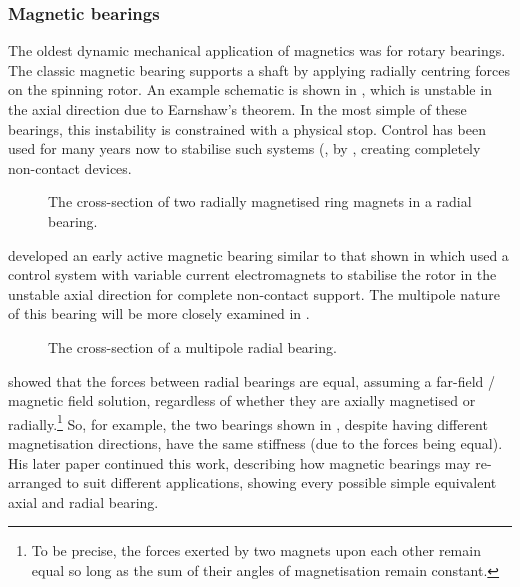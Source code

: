 \subsubsection{Magnetic bearings}

The oldest dynamic mechanical application of magnetics was for rotary
bearings.  The classic magnetic bearing supports a shaft by applying
radially centring forces on the spinning rotor. An example schematic
is shown in , which is unstable in the axial
direction due to Earnshaw's theorem. In the most simple of these
bearings, this instability is constrained with a physical stop.
Control has been used for many years now to stabilise such systems
(\eg, by \textcite{shimizu1968}, creating completely non-contact devices.

\begin{figure}
  \caption[Radial bearing cross section.]{The cross-section of two radially
magnetised ring magnets in a radial bearing.}
\end{figure}

\textcite{backers1961} developed an early active magnetic bearing similar to that shown in  which used a control system with variable current electromagnets to stabilise the rotor in the unstable axial direction for complete non-contact support.
The multipole nature of this bearing will be more closely examined in .

\begin{figure}
  \caption[Multipole bearing cross section.]{The cross-section of a
    multipole radial bearing.}
\end{figure}

\textcite{yonnet1978} showed that the forces between radial bearings are
equal, assuming a far-field \twoD/ magnetic field solution, regardless of whether they are axially magnetised or radially.\footnote{To
be precise, the forces exerted by two magnets upon each other remain equal so
long as the sum of their angles of magnetisation remain constant.} So, for
example, the two bearings shown in , despite having
different magnetisation directions, have the same stiffness (due to the forces
being equal).
His later paper \cite{yonnet1981} continued this work, describing
how magnetic bearings may re-arranged to suit different applications,
showing every possible simple equivalent axial and radial bearing.



